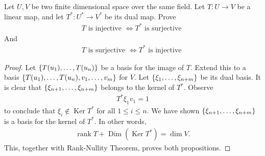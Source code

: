 \documentclass{report}
\begin{document}
\begin{question}{}{}
  Let $U,V$ be two finite dimensional space over the same field. Let  $T:U\rightarrow V$ be a linear map, and let $T^*:U^*\rightarrow V^*$ be its dual map. Prove 
\begin{align*}
T\text{ is injective }\iff T^*\text{ is surjective }   
\end{align*}
And 
\begin{align*}
T\text{ is surjective }\iff T^*\text{ is injective }
\end{align*}
\end{question}
\begin{proof}
Let $\{ T(u_1),\dots ,T(u_n) \}$ be a basis for the image of $T$. Extend this to a basis $\{ T(u_1),\dots ,T(u_n),v_1,\dots ,v_m \}$ for $V$. Let $\{ \xi_1,\dots ,\xi_{n+m} \}$ be its dual basis. It is clear that $\{ \xi_{n+1},\dots ,\xi_{n+m} \}$ belongs to the kernel of $T^*$. Observe  
\begin{align*}
T^*\xi_1v_1 = 1
\end{align*}
to conclude that $\xi_i \not\in \operatorname{Ker}T^*$ for all $1\leq i\leq n$. We have shown $\{ \xi_{n+1},\dots ,\xi_{n+m} \}$ is a basis for the kernel of $T^*$. In other words,  
\begin{align*}
   \operatorname{rank}T+\operatorname{Dim}(\operatorname{Ker}T^*)= \operatorname{dim}V.
\end{align*}
This, together with Rank-Nullity Theorem, proves both propositions.
\end{proof}
\end{document}
